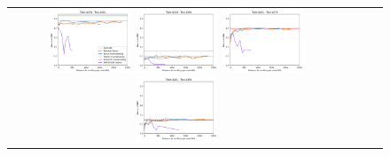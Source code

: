 \begin{figure}[h!]
\begin{tabular}{cccc}

  \includegraphics[width=0.25\textwidth]{Kap7/UNIFIED_train=b234_test=b261_rbf_curves.png}  \includegraphics[width=0.25\textwidth]{Kap7/UNIFIED_train=b234_test=b360_rbf_curves.png}
  \includegraphics[width=0.25\textwidth]{Kap7/UNIFIED_train=b261_test=b278_rbf_curves.png}  \includegraphics[width=0.25\textwidth]{Kap7/UNIFIED_train=b261_test=b360_rbf_curves.png} \\


\end{tabular}
\end{figure}
